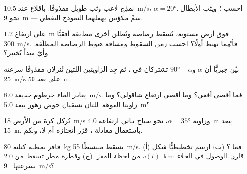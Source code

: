 \begin{exercise}[$\star\star$]\label{exo:g12:projectile-motion:9}
نمذِج لاعب وثب طويل مقذوفًا: بإقلاع عند \qty{10.5}{m/s}،
$\alpha = \ang{20}$. احسب ؛ ويثب الأبطال نحو \qty{9}{m}
--- سمِّ مكوّنين يهملهما النموذج النقطي.
\end{exercise}

\begin{exercise}[$\star\star$]\label{exo:g12:projectile-motion:10}
على ارتفاع \qty{1.2}{m} فوق أرض مستوية، تُسقط رصاصة وتُطلق أخرى
مطابقة أفقيًّا  \qty{300}{m/s}. فأيّهما تهبط أولًا؟ احسب
زمن السقوط ومسافة هبوط الرصاصة المطلَقة. وأيّ مبدأ
يُختبر؟
\end{exercise}

\begin{exercise}[$\star\star$]\label{exo:g12:projectile-motion:11}
بيّن جبريًّا أن $\alpha$ و$\ang{90} - \alpha$ تشتركان في
، ثم جِد الزاويتين اللتين تُنزلان مقذوفًا سرعته \qty{25}{m/s}
على بعد \qty{50}{m}.
\end{exercise}

\begin{exercise}[$\star\star\star$]\label{exo:g12:projectile-motion:12}
يغادر الماء خرطوم حديقة  \qty{8.0}{m/s}: فما أقصى  أفقي؟
وما أقصى ارتفاع شاقولي؟ وما زاويتا الفوهة اللتان تسقيان حوض زهور
يبعد \qty{5.0}{m}؟
\end{exercise}

\begin{exercise}[$\star\star\star$]\label{exo:g12:projectile-motion:13}
تُركل كرة من الأرض  \qty{18}{m/s} وزاوية $\alpha = \ang{35}$،
نحو سياج نباتي ارتفاعه \qty{4.0}{m} يبعد \qty{15}{m}. باستعمال معادلة
، قرّر أتجتازه أم لا، وبكم.
\end{exercise}

\begin{exercise}[$\star\star\star$]\label{exo:g12:projectile-motion:14}
قافز بمظلة كتلته \qty{80}{kg} يسقط منبسطًا  \qty{55}{m/s}.
(أ) فما  ؟ (ب) ارسم تخطيطيًّا شكل $v(t)$ من لحظة القفز. (ج) وقطرة مطر
تسقط من \qty{2.0}{km}: قارن  الوصول في الخلاء بسرعتها \ 
\qty{9}{m/s}؟
\end{exercise}

